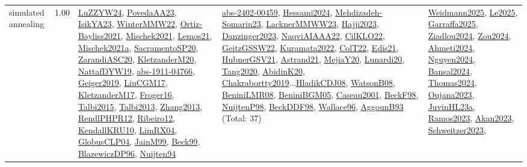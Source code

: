 {\begin{longtable}{p{3cm}r>{\raggedright\arraybackslash}p{6cm}>{\raggedright\arraybackslash}p{6cm}>{\raggedright\arraybackslash}p{8cm}}
\index{simulated annealing}\index{Algorithms!simulated annealing}simulated annealing &  1.00 & \hyperref[detail:LuZZYW24]{LuZZYW24}, \hyperref[detail:PovedaAA23]{PovedaAA23}, \hyperref[detail:IsikYA23]{IsikYA23}, \hyperref[detail:WinterMMW22]{WinterMMW22}, \hyperref[detail:Ortiz-Bayliss2021]{Ortiz-Bayliss2021}, \hyperref[detail:Mischek2021]{Mischek2021}, \hyperref[detail:Lemos21]{Lemos21}, \hyperref[detail:Mischek2021a]{Mischek2021a}, \hyperref[detail:SacramentoSP20]{SacramentoSP20}, \hyperref[detail:ZarandiASC20]{ZarandiASC20}, \hyperref[detail:KletzanderM20]{KletzanderM20}, \hyperref[detail:NattafDYW19]{NattafDYW19}, \hyperref[detail:abs-1911-04766]{abs-1911-04766}, \hyperref[detail:Geiger2019]{Geiger2019}, \hyperref[detail:LiuCGM17]{LiuCGM17}, \hyperref[detail:KletzanderM17]{KletzanderM17}, \hyperref[detail:Froger16]{Froger16}, \hyperref[detail:Talbi2015]{Talbi2015}, \hyperref[detail:Talbi2013]{Talbi2013}, \hyperref[detail:Zhang2013]{Zhang2013}, \hyperref[detail:RendlPHPR12]{RendlPHPR12}, \hyperref[detail:Ribeiro12]{Ribeiro12}, \hyperref[detail:KendallKRU10]{KendallKRU10}, \hyperref[detail:LimRX04]{LimRX04}, \hyperref[detail:GlobusCLP04]{GlobusCLP04}, \hyperref[detail:JainM99]{JainM99}, \hyperref[detail:Beck99]{Beck99}, \hyperref[detail:BlazewiczDP96]{BlazewiczDP96}, \hyperref[detail:Nuijten94]{Nuijten94} & \hyperref[detail:abs-2402-00459]{abs-2402-00459}, \hyperref[detail:Hessami2024]{Hessami2024}, \hyperref[detail:Mehdizadeh-Somarin23]{Mehdizadeh-Somarin23}, \hyperref[detail:LacknerMMWW23]{LacknerMMWW23}, \hyperref[detail:Hajji2023]{Hajji2023}, \hyperref[detail:Danzinger2023]{Danzinger2023}, \hyperref[detail:NaqviAIAAA22]{NaqviAIAAA22}, \hyperref[detail:CilKLO22]{CilKLO22}, \hyperref[detail:GeitzGSSW22]{GeitzGSSW22}, \hyperref[detail:Kuramata2022]{Kuramata2022}, \hyperref[detail:ColT22]{ColT22}, \hyperref[detail:Edis21]{Edis21}, \hyperref[detail:HubnerGSV21]{HubnerGSV21}, \hyperref[detail:Astrand21]{Astrand21}, \hyperref[detail:MejiaY20]{MejiaY20}, \hyperref[detail:Lunardi20]{Lunardi20}, \hyperref[detail:Tang2020]{Tang2020}, \hyperref[detail:AbidinK20]{AbidinK20}, \hyperref[detail:Chakrabortty2019]{Chakrabortty2019}...\hyperref[detail:HladikCDJ08]{HladikCDJ08}, \hyperref[detail:WatsonB08]{WatsonB08}, \hyperref[detail:BeniniLMR08]{BeniniLMR08}, \hyperref[detail:BeniniBGM05]{BeniniBGM05}, \hyperref[detail:Caseau2001]{Caseau2001}, \hyperref[detail:BeckF98]{BeckF98}, \hyperref[detail:NuijtenP98]{NuijtenP98}, \hyperref[detail:BeckDDF98]{BeckDDF98}, \hyperref[detail:Wallace96]{Wallace96}, \hyperref[detail:AggounB93]{AggounB93} (Total: 37) & \hyperref[detail:Weidmann2025]{Weidmann2025}, \hyperref[detail:Le2025]{Le2025}, \hyperref[detail:Garraffa2025]{Garraffa2025}, \hyperref[detail:Ziadlou2024]{Ziadlou2024}, \hyperref[detail:Zou2024]{Zou2024}, \hyperref[detail:Ahmeti2024]{Ahmeti2024}, \hyperref[detail:Nguyen2024]{Nguyen2024}, \hyperref[detail:Bansal2024]{Bansal2024}, \hyperref[detail:Thomas2024]{Thomas2024}, \hyperref[detail:Oujana2023]{Oujana2023}, \hyperref[detail:JuvinHL23a]{JuvinHL23a}, \hyperref[detail:Ramos2023]{Ramos2023}, \hyperref[detail:Akan2023]{Akan2023}, \hyperref[detail:Schweitzer2023]{Schweitzer2023}, 
\end{longtable}}
